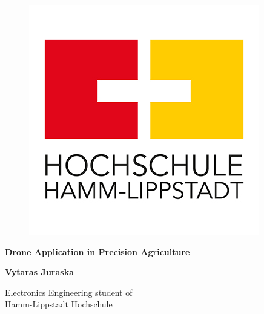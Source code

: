 \documentclass[11pt,a5paper,footinclude=true,headinclude=true, oneside]{scrbook}
\begin{document}
\begin{titlepage}
   \begin{center}
       \vspace*{1cm}

        \begin{figure}[htbp]
            \centerline{\includegraphics[scale=.5]{hs-hl.jpg}}
        \end{figure}
       \textbf{Drone Application in Precision Agriculture}
            
       \vspace{0.5cm}

       \textbf{Vytaras Juraska}

       \vfill
            
       \vspace{0.8cm}
            
       Electronics Engineering student of\\
       Hamm-Lippstadt Hochschule\\
            
   \end{center}
\end{titlepage}

	
	\tableofcontents 

\end{document}
